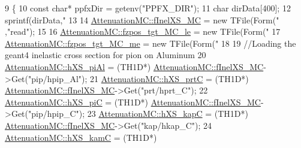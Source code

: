 \begin{DoxyCode}
9                               \{
10     \textcolor{keyword}{const} \textcolor{keywordtype}{char}* ppfxDir = getenv(\textcolor{stringliteral}{"PPFX\_DIR"});
11     \textcolor{keywordtype}{char} dirData[400]; 
12     sprintf(dirData,\textcolor{stringliteral}{"%
13 
14     \hyperlink{class_neutrino_flux_reweight_1_1_attenuation_m_c_a5c8c620e955ec534263d78013c1c086a}{AttenuationMC::fInelXS\_MC} = \textcolor{keyword}{new} TFile(Form(\textcolor{stringliteral}{"%
      ,\textcolor{stringliteral}{"read"});
15 
16     \hyperlink{class_neutrino_flux_reweight_1_1_attenuation_m_c_a66fcb5745e72eda64f9081b5b0ef4399}{AttenuationMC::fzpos\_tgt\_MC\_le} = \textcolor{keyword}{new} TFile(Form(\textcolor{stringliteral}{"
17     \hyperlink{class_neutrino_flux_reweight_1_1_attenuation_m_c_a93e5ae3f1982c3dddd6c57ea47e230ea}{AttenuationMC::fzpos\_tgt\_MC\_me} = \textcolor{keyword}{new} TFile(Form(\textcolor{stringliteral}{"
18     
19     \textcolor{comment}{//Loading the geant4 inelastic cross section for pion on Aluminum}
20     \hyperlink{class_neutrino_flux_reweight_1_1_attenuation_m_c_a7a9edf7fb1e5af0611eacfaba7d63879}{AttenuationMC::hXS\_piAl}  = (TH1D*)
      \hyperlink{class_neutrino_flux_reweight_1_1_attenuation_m_c_a5c8c620e955ec534263d78013c1c086a}{AttenuationMC::fInelXS\_MC}->Get(\textcolor{stringliteral}{"pip/hpip\_Al"});
21     \hyperlink{class_neutrino_flux_reweight_1_1_attenuation_m_c_a6a8883254ecc6e301643493923c3cde0}{AttenuationMC::hXS\_prtC}  = (TH1D*)
      \hyperlink{class_neutrino_flux_reweight_1_1_attenuation_m_c_a5c8c620e955ec534263d78013c1c086a}{AttenuationMC::fInelXS\_MC}->Get(\textcolor{stringliteral}{"prt/hprt\_C"});
22     \hyperlink{class_neutrino_flux_reweight_1_1_attenuation_m_c_aa7f4bb3745202fd3a48fb9e295317219}{AttenuationMC::hXS\_piC}   = (TH1D*)
      \hyperlink{class_neutrino_flux_reweight_1_1_attenuation_m_c_a5c8c620e955ec534263d78013c1c086a}{AttenuationMC::fInelXS\_MC}->Get(\textcolor{stringliteral}{"pip/hpip\_C"});
23     \hyperlink{class_neutrino_flux_reweight_1_1_attenuation_m_c_afe67d35bfdea4d6b91bd6b16f7404bb2}{AttenuationMC::hXS\_kapC}  = (TH1D*)
      \hyperlink{class_neutrino_flux_reweight_1_1_attenuation_m_c_a5c8c620e955ec534263d78013c1c086a}{AttenuationMC::fInelXS\_MC}->Get(\textcolor{stringliteral}{"kap/hkap\_C"});
24     \hyperlink{class_neutrino_flux_reweight_1_1_attenuation_m_c_a89dfdfa2e55926db7bdc4ec685e0003e}{AttenuationMC::hXS\_kamC}  = (TH1D*)
}}}}
\end{DoxyCode}
